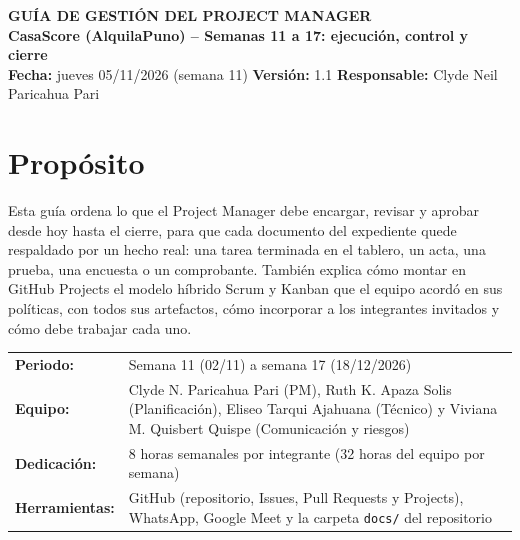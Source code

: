 \documentclass[11pt,a4paper]{article}
\begin{document}
\shorthandoff{<>}

\begin{center}
    {\Large \textbf{\textcolor{AzulUNA}{GUÍA DE GESTIÓN DEL PROJECT MANAGER}}}\\[3pt]
    {\normalsize \textbf{CasaScore (AlquilaPuno) -- Semanas 11 a 17: ejecución, control y cierre}}\\[4pt]
    \footnotesize \textbf{Fecha:} jueves 05/11/2026 (semana 11) \quad \textbar\quad \textbf{Versión:} 1.1 \quad \textbar\quad \textbf{Responsable:} Clyde Neil Paricahua Pari
\end{center}

\vspace{0.1cm}

\section{Propósito}
Esta guía ordena lo que el Project Manager debe encargar, revisar y aprobar desde hoy hasta el cierre, para que cada documento del expediente quede respaldado por un hecho real: una tarea terminada en el tablero, un acta, una prueba, una encuesta o un comprobante. También explica cómo montar en GitHub Projects el modelo híbrido Scrum y Kanban que el equipo acordó en sus políticas, con todos sus artefactos, cómo incorporar a los integrantes invitados y cómo debe trabajar cada uno.

\vspace{0.1cm}
\noindent\begin{tabularx}{\textwidth}{@{}P{4.0cm} L@{}}
\toprule
\textbf{Periodo:} & Semana 11 (02/11) a semana 17 (18/12/2026) \\
\textbf{Equipo:} & Clyde N. Paricahua Pari (PM), Ruth K. Apaza Solis (Planificación), Eliseo Tarqui Ajahuana (Técnico) y Viviana M. Quisbert Quispe (Comunicación y riesgos) \\
\textbf{Dedicación:} & 8 horas semanales por integrante (32 horas del equipo por semana) \\
\textbf{Herramientas:} & GitHub (repositorio, Issues, Pull Requests y Projects), WhatsApp, Google Meet y la carpeta \texttt{docs/} del repositorio \\
\bottomrule
\end{tabularx}
\end{document}
